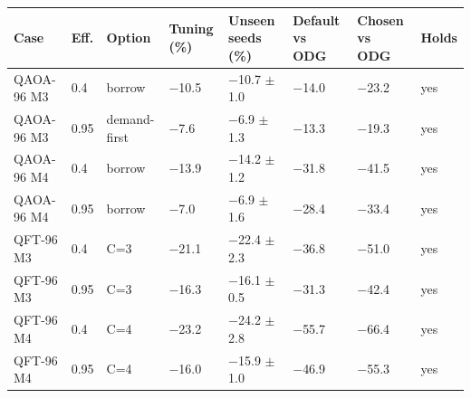 \begin{tabular}{llllllll}
\toprule
Case & Eff. & Option & Tuning (\%) & Unseen seeds (\%) & Default vs ODG & Chosen vs ODG & Holds \\
\midrule
QAOA-96 M3 & 0.4 & borrow & $-$10.5 & $-$10.7 $\pm$ 1.0 & $-$14.0 & $-$23.2 & yes \\
QAOA-96 M3 & 0.95 & demand-first & $-$7.6 & $-$6.9 $\pm$ 1.3 & $-$13.3 & $-$19.3 & yes \\
QAOA-96 M4 & 0.4 & borrow & $-$13.9 & $-$14.2 $\pm$ 1.2 & $-$31.8 & $-$41.5 & yes \\
QAOA-96 M4 & 0.95 & borrow & $-$7.0 & $-$6.9 $\pm$ 1.6 & $-$28.4 & $-$33.4 & yes \\
QFT-96 M3 & 0.4 & C=3 & $-$21.1 & $-$22.4 $\pm$ 2.3 & $-$36.8 & $-$51.0 & yes \\
QFT-96 M3 & 0.95 & C=3 & $-$16.3 & $-$16.1 $\pm$ 0.5 & $-$31.3 & $-$42.4 & yes \\
QFT-96 M4 & 0.4 & C=4 & $-$23.2 & $-$24.2 $\pm$ 2.8 & $-$55.7 & $-$66.4 & yes \\
QFT-96 M4 & 0.95 & C=4 & $-$16.0 & $-$15.9 $\pm$ 1.0 & $-$46.9 & $-$55.3 & yes \\
\bottomrule
\end{tabular}
